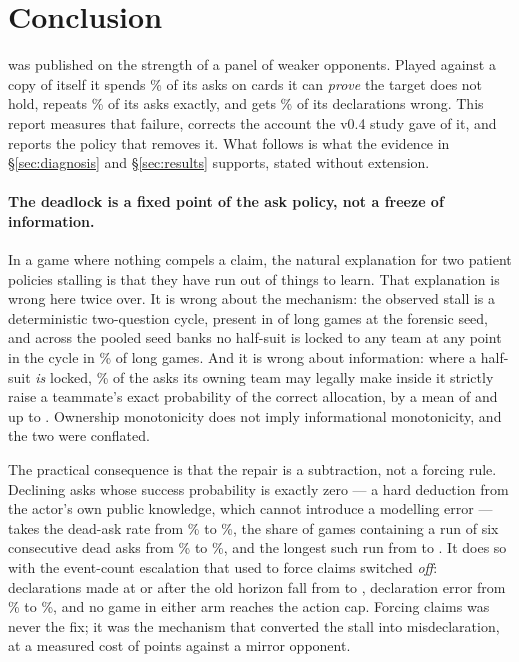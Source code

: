 \section{Conclusion}
\label{sec:conclusion}

\vfour{} was published on the strength of a panel of weaker opponents. Played
against a copy of itself it spends \numDeadAsk\% of its asks on cards it can
\emph{prove} the target does not hold, repeats \numRepeatAsk\% of its asks
exactly, and gets \numDeclWrong\% of its declarations wrong. This report
measures that failure, corrects the account the v0.4 study gave of it, and
reports the policy that removes it. What follows is what the evidence in
\S\ref{sec:diagnosis} and \S\ref{sec:results} supports, stated without
extension.

\paragraph{The deadlock is a fixed point of the ask policy, not a freeze of
information.} In a game where nothing compels a claim, the natural explanation
for two patient policies stalling is that they have run out of things to learn.
That explanation is wrong here twice over. It is wrong about the mechanism: the
observed stall is a deterministic two-question cycle, present in \numPureCycle{}
of \numLongGames{} long games at the forensic seed, and across the pooled seed
banks no half-suit is locked to any team at any point in the cycle in
\numNoLockPct\% of long games. And it is wrong about
information: where a half-suit \emph{is} locked, \numCertRate\% of the asks its
owning team may legally make inside it strictly raise a teammate's exact
probability of the correct allocation, by a mean of \numCertMean{} and up to
\numCertMax{}. Ownership monotonicity does not imply informational monotonicity,
and the two were conflated.

The practical consequence is that the repair is a subtraction, not a forcing
rule. Declining asks whose success probability is exactly zero --- a hard
deduction from the actor's own public knowledge, which cannot introduce a
modelling error --- takes the dead-ask rate from \numFourDeadAsk\% to
\numFiveDeadAsk\%, the share of games containing a run of six consecutive dead
asks from \numFourDeadRunGames\% to \numFiveDeadRunGames\%, and the longest such
run from \numFourDeadRunLongest{} to \numFiveDeadRunLongest{}. It does so with
the event-count escalation that used to force claims switched \emph{off}:
declarations made at or after the old horizon fall from
\numFourPostHorizonDecl{} to \numFivePostHorizonDecl{}, declaration error from
\numFourDeclWrong\% to \numFiveDeclWrong\%, and no game in either arm reaches
the action cap. Forcing claims was never the fix; it was the mechanism that
converted the stall into misdeclaration, at a measured cost of
\numStageTwoCost{} points against a mirror opponent.

